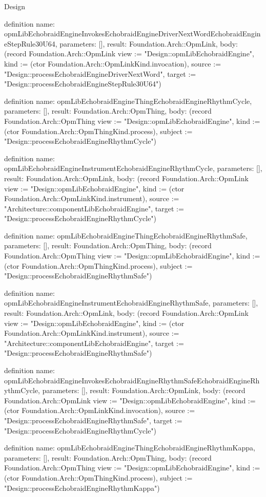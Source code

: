 \begin{lexlean}{Design}
\begin{semanticmodule}
definition{
  name: opmLibEchobraidEngineInvokesEchobraidEngineDriverNextWordEchobraidEngineStepRule30U64,
  parameters: [],
  result: Foundation.Arch::OpmLink,
  body: (record Foundation.Arch::OpmLink {view := "Design::opmLibEchobraidEngine", kind := (ctor Foundation.Arch::OpmLinkKind.invocation), source := "Design::processEchobraidEngineDriverNextWord", target := "Design::processEchobraidEngineStepRule30U64"})
}

definition{
  name: opmLibEchobraidEngineThingEchobraidEngineRhythmCycle,
  parameters: [],
  result: Foundation.Arch::OpmThing,
  body: (record Foundation.Arch::OpmThing {view := "Design::opmLibEchobraidEngine", kind := (ctor Foundation.Arch::OpmThingKind.process), subject := "Design::processEchobraidEngineRhythmCycle"})
}

definition{
  name: opmLibEchobraidEngineInstrumentEchobraidEngineRhythmCycle,
  parameters: [],
  result: Foundation.Arch::OpmLink,
  body: (record Foundation.Arch::OpmLink {view := "Design::opmLibEchobraidEngine", kind := (ctor Foundation.Arch::OpmLinkKind.instrument), source := "Architecture::componentLibEchobraidEngine", target := "Design::processEchobraidEngineRhythmCycle"})
}

definition{
  name: opmLibEchobraidEngineThingEchobraidEngineRhythmSafe,
  parameters: [],
  result: Foundation.Arch::OpmThing,
  body: (record Foundation.Arch::OpmThing {view := "Design::opmLibEchobraidEngine", kind := (ctor Foundation.Arch::OpmThingKind.process), subject := "Design::processEchobraidEngineRhythmSafe"})
}

definition{
  name: opmLibEchobraidEngineInstrumentEchobraidEngineRhythmSafe,
  parameters: [],
  result: Foundation.Arch::OpmLink,
  body: (record Foundation.Arch::OpmLink {view := "Design::opmLibEchobraidEngine", kind := (ctor Foundation.Arch::OpmLinkKind.instrument), source := "Architecture::componentLibEchobraidEngine", target := "Design::processEchobraidEngineRhythmSafe"})
}

definition{
  name: opmLibEchobraidEngineInvokesEchobraidEngineRhythmSafeEchobraidEngineRhythmCycle,
  parameters: [],
  result: Foundation.Arch::OpmLink,
  body: (record Foundation.Arch::OpmLink {view := "Design::opmLibEchobraidEngine", kind := (ctor Foundation.Arch::OpmLinkKind.invocation), source := "Design::processEchobraidEngineRhythmSafe", target := "Design::processEchobraidEngineRhythmCycle"})
}

definition{
  name: opmLibEchobraidEngineThingEchobraidEngineRhythmKappa,
  parameters: [],
  result: Foundation.Arch::OpmThing,
  body: (record Foundation.Arch::OpmThing {view := "Design::opmLibEchobraidEngine", kind := (ctor Foundation.Arch::OpmThingKind.process), subject := "Design::processEchobraidEngineRhythmKappa"})
}


\end{semanticmodule}
\end{lexlean}
